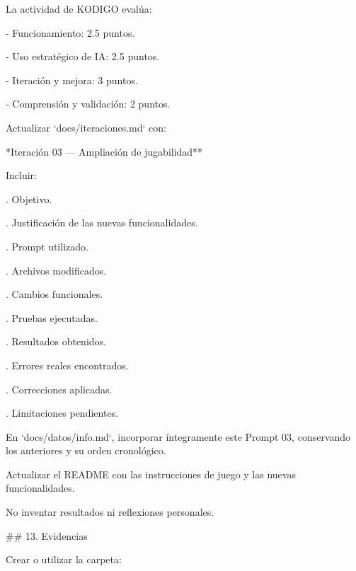 \par\smallskip
\noindent La actividad de KODIGO evalúa:\par
\par\smallskip
\noindent - Funcionamiento: 2.5 puntos.\par
\noindent - Uso estratégico de IA: 2.5 puntos.\par
\noindent - Iteración y mejora: 3 puntos.\par
\noindent - Comprensión y validación: 2 puntos.\par
\par\smallskip
\noindent Actualizar `docs/iteraciones.md` con:\par
\par\smallskip
\noindent **Iteración 03 — Ampliación de jugabilidad**\par
\par\smallskip
\noindent Incluir:\par
\par\smallskip
{}. Objetivo.\par
{}. Justificación de las nuevas funcionalidades.\par
{}. Prompt utilizado.\par
{}. Archivos modificados.\par
{}. Cambios funcionales.\par
{}. Pruebas ejecutadas.\par
{}. Resultados obtenidos.\par
{}. Errores reales encontrados.\par
{}. Correcciones aplicadas.\par
{}. Limitaciones pendientes.\par
\par\smallskip
\noindent En `docs/datos/info.md`, incorporar íntegramente este Prompt 03, conservando los anteriores y su orden cronológico.\par
\par\smallskip
\noindent Actualizar el README con las instrucciones de juego y las nuevas funcionalidades.\par
\par\smallskip
\noindent No inventar resultados ni reflexiones personales.\par
\par\smallskip
\noindent \#\# 13. Evidencias\par
\par\smallskip
\noindent Crear o utilizar la carpeta:\par
